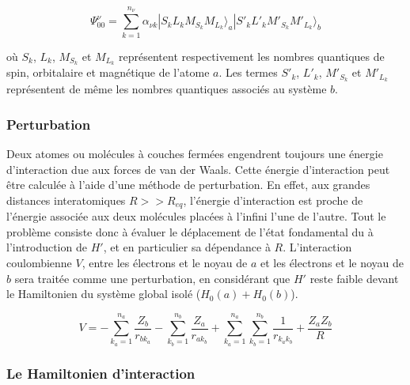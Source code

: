 	\begin{equation}
	\Psi_{00}^{\nu} = \sum_{k=1}^{n_{\nu}} \alpha_{\nu k}| S_{k} L_{k} M_{S_{k}} M_{L_{k}} \rangle _{a} | S'_{k} L'_{k} M'_{S_{k}} M'_{L_{k}} \rangle _{b}
	\end{equation}
	
	\noindent où $S_{k}$, $L_{k}$, $M_{S_{k}}$ et $M_{L_{k}}$ représentent respectivement les nombres quantiques de spin, orbitalaire et magnétique de l'atome $a$. Les termes $S'_{k}$, $L'_{k}$, $M'_{S_{k}}$ et $M'_{L_{k}}$ représentent de même les nombres quantiques associés au système $b$.
	
	\subsubsection{Perturbation}
	
	Deux atomes ou molécules à couches fermées engendrent toujours une énergie d'interaction due aux forces de van der Waals. Cette énergie d'interaction peut être calculée à l'aide d'une méthode de perturbation. En effet, aux grandes distances interatomiques $R>>R_{eq}$, l'énergie d'interaction est proche de l'énergie associée aux deux molécules placées à l'infini l'une de l'autre.  
	Tout le problème consiste donc à évaluer le déplacement de l'état fondamental du à l'introduction de $H'$, et en particulier sa dépendance à $R$. L'interaction coulombienne $V$, entre les électrons et le noyau de $a$ et les électrons et le noyau de $b$ sera traitée comme une perturbation, en considérant que $H'$ reste faible devant le Hamiltonien du système global isolé ($H_{0}(a)+ H_{0}(b)$). 
	
	
	\begin{equation}
	V = - \sum_{k_{a}=1}^{n_{a}} \frac{Z_{b}}{r_{bk_{a}}} - \sum_{k_{b}=1}^{n_{b}} \frac{Z_{a}}{r_{ak_{b}}} + \sum_{k_{a}=1}^{n_{a}} \sum_{k_{b}=1}^{n_{b}} \frac{1}{r_{k_{a}k_{b}}} + \frac{Z_{a} Z_{b}}{R}
	\end{equation}
	
	\subsubsection{Le Hamiltonien d'interaction}
	
